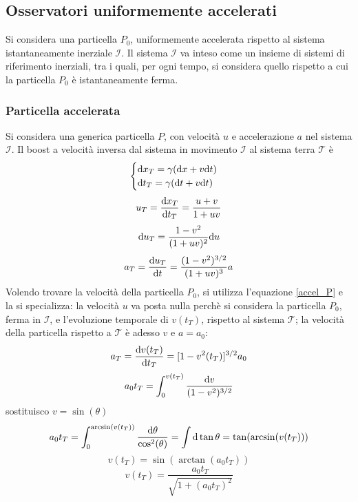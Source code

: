 \subsection{ Osservatori uniformemente accelerati}
Si considera una particella $P_0$, uniformemente accelerata rispetto al sistema istantaneamente inerziale  $\mathcal{I}$.
Il sistema $\mathcal{I}$ va inteso come un insieme di sistemi di riferimento inerziali, tra i quali, per ogni tempo, si considera quello rispetto a cui la particella $P_0$ \`e istantaneamente ferma.
\subsubsection{Particella accelerata}
Si considera una generica particella $P$, con velocit\`a $u$ e accelerazione $a$ nel sistema $\mathcal{I}$.
Il boost a velocit\`a inversa dal sistema in movimento $\mathcal{I}$ al sistema terra $\mathcal{T}$ \`e
\begin{equation}
	\begin{cases}
		\mathrm{d} x_T = \gamma (\mathrm{d} x + v \mathrm{d} t) &  \\
		\mathrm{d} t_T = \gamma (\mathrm{d} t + v \mathrm{d} t) &  \\ 
	\end{cases}
\end{equation}
\[  u_T = \frac{\mathrm{d} x_T}{\mathrm{d} t_T} = \frac{u+v}{1+uv} \]
\[ \mathrm{d} u_T = \frac{1-v^2}{(1+uv)^2} \mathrm{d} u \]
\begin{equation} \label{accel_P}
	a_T = \frac{\mathrm{d} u_T}{\mathrm{d} t} = \frac{(1-v^2)^{3/2}}{(1+uv)^3} a 
\end{equation}
Volendo trovare la velocit\`a della particella $P_0$, si utilizza l'equazione \ref{accel_P} e la si specializza: la velocit\`a $u$ va posta nulla perch\`e si considera la particella $P_0$, ferma in $\mathcal{I}$, e l'evoluzione temporale di $v(t_T)$, rispetto al sistema $\mathcal{T}$; la velocit\`a della particella rispetto a $\mathcal{T}$ \`e adesso $v$ e \( a = a_0 \):
\[ a_T = \frac{\mathrm{d} v(t_T)}{\mathrm{d} t_T} = [1-v^2(t_T)]^{3/2} a_0 \]
\[ a_0t_T = \int_0^{v(t_T)} \frac{\mathrm{d} v}{(1-v^2)^{3/2}} \]
sostituisco $v=\sin(\theta)$
\[ a_0t_T= \int_0^{\arcsin(v(t_T))} \frac{\mathrm{d} \theta}{\cos^2(\theta)} = \int \mathrm{d}\tan\theta = \tan(\arcsin(v(t_T))) \]
\[ v(t_T) = \sin(\arctan(a_0t_T)) \]
\begin{equation} \label{veloc}
		v(t_T) = \frac{a_0 t_T}{\sqrt{1+(a_0t_T)^2}} 
\end{equation}

